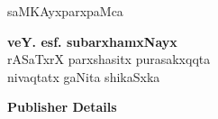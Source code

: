 \thispagestyle{empty}
\begin{center}
{\fontsize{30}{32}\selectfont saMKAyxparxpaMca}%
\vfill


{\LARGE\bfseries veY. esf. subarxhamxNayx}\\[4pt]
{\large rASaTxrX parxshasitx purasakxqqta\\[4pt]
nivaqtatx gaNita shikaSxka}
\vfill

{\Large\rm\bfseries Publisher Details}





\end{center}
